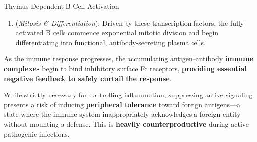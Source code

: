 \begin{core}{Thymus Dependent B Cell Activation}
\begin{enumerate}[label=(\arabic*)]
\begin{enumerate}
\begin{itemize}
              \item Concurrently, DAG activation propagates signals that result in the targeted \textbf{degradation of the IκB inhibitory complex}, thereby unleashing the potent pro-inflammatory transcription factor \textbf{NF-κB} to enter the nucleus.

            \end{itemize}

            \item \textbf{MAPK/ERK Kinase Cascade}: Through adapter proteins, the classical \textbf{RAS-RAF-MEK-ERK phosphorylation cascade} is initiated. This culminates in the nuclear translocation of activated ERK proteins, which directly upregulate essential target genes controlling cellular proliferation and differentiation.

            \item \textbf{PI3K Activation}: The activated BCR complex recruits \textbf{PI3K}, which phosphorylates residual membrane \textbf{PIP2 to yield PIP3}. The accumulation of PIP3 provides a powerful overarching survival signal, effectively \textbf{blocking apoptotic pathways} during the stress of rapid clonal expansion.

          \end{enumerate}

          \item (\textit{Mitosis \& Differentiation}): Driven by these transcription factors, the fully activated B cells commence exponential mitotic division and begin differentiating into functional, antibody-secreting plasma cells.

        \end{enumerate}

        As the immune response progresses, the accumulating antigen--antibody \textbf{immune complexes} begin to bind inhibitory surface Fc receptors, \textbf{providing essential negative feedback to safely curtail the response}.


        While strictly necessary for controlling inflammation, suppressing active signaling presents a risk of inducing \textbf{peripheral tolerance} toward foreign antigens---a state where the immune system inappropriately acknowledges a foreign entity without mounting a defense. This is \textbf{heavily counterproductive} during active pathogenic infections.


\end{core}
